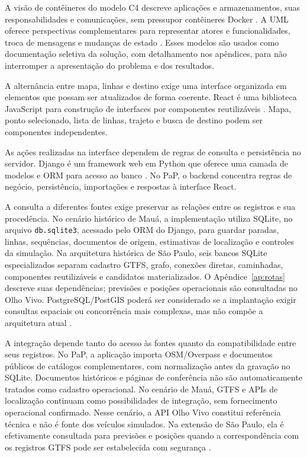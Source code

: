 \documentclass[12pt,oneside,a4paper,brazil,chapter=TITLE]{abntex2}
\begin{document}
A visão de contêineres do modelo C4 descreve aplicações e armazenamentos, suas responsabilidades e comunicações, sem pressupor contêineres Docker \citep{c4container}. A UML oferece perspectivas complementares para representar atores e funcionalidades, troca de mensagens e mudanças de estado \citep{uml251}. Esses modelos são usados como documentação seletiva da solução, com detalhamento nos apêndices, para não interromper a apresentação do problema e dos resultados.

A alternância entre mapa, linhas e destino exige uma interface organizada em elementos que possam ser atualizados de forma coerente. React é uma biblioteca JavaScript para construção de interfaces por componentes reutilizáveis \citep{react}. Mapa, ponto selecionado, lista de linhas, trajeto e busca de destino podem ser componentes independentes.

As ações realizadas na interface dependem de regras de consulta e persistência no servidor. Django é um framework web em Python que oferece uma camada de modelos e ORM para acesso ao banco \citep{django}. No PaP, o backend concentra regras de negócio, persistência, importações e respostas à interface React.

A consulta a diferentes fontes exige preservar as relações entre os registros e sua procedência. No cenário histórico de Mauá, a implementação utiliza SQLite, no arquivo \texttt{db.sqlite3}, acessado pelo ORM do Django, para guardar paradas, linhas, sequências, documentos de origem, estimativas de localização e controles da simulação. Na arquitetura histórica de São Paulo, seis bancos SQLite especializados separam cadastro GTFS, grafo, conexões diretas, caminhadas, componentes reutilizáveis e candidatos materializados. O Apêndice~\ref{ap:rotas} descreve suas dependências; previsões e posições operacionais são consultadas no Olho Vivo. PostgreSQL/PostGIS poderá ser considerado se a implantação exigir consultas espaciais ou concorrência mais complexas, mas não compõe a arquitetura atual \citep{postgis}.

A integração depende tanto do acesso às fontes quanto da compatibilidade entre seus registros. No PaP, a aplicação importa OSM/Overpass e documentos públicos de catálogos complementares, com normalização antes da gravação no SQLite. Documentos históricos e páginas de conferência não são automaticamente tratados como cadastro operacional. No cenário de Mauá, GTFS e APIs de localização continuam como possibilidades de integração, sem fornecimento operacional confirmado. Nesse cenário, a API Olho Vivo constitui referência técnica e não é fonte dos veículos simulados. Na extensão de São Paulo, ela é efetivamente consultada para previsões e posições quando a correspondência com os registros GTFS pode ser estabelecida com segurança \citep{sptransapi}.
\end{document}

